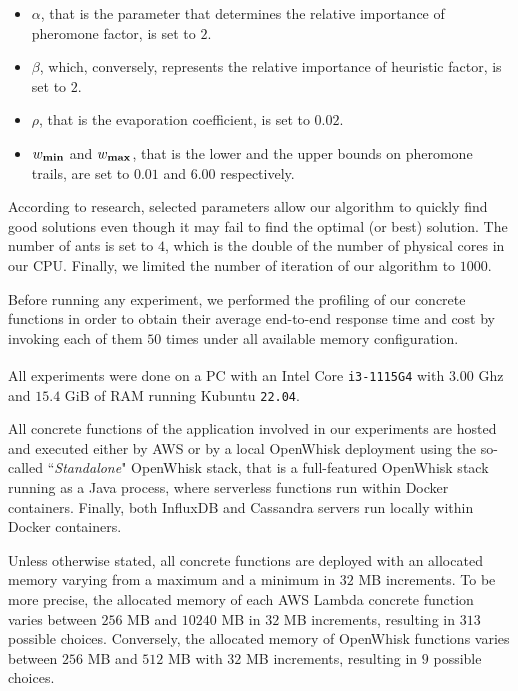 \documentclass[12pt,a4paper]{report}
\newcommand{\ItalicQuotMark}[1]{``\textit{#1}"}
\begin{document}
\begin{itemize}
	\item $\alpha$, that is the parameter that determines the relative importance of pheromone factor, is set to $2$.
	\item $\beta$, which, conversely, represents the relative importance of heuristic factor, is set to $2$.
	\item $\rho$, that is the evaporation coefficient, is set to $0.02$.
	\item $w_{\text{\textbf{min}}}$ and $w_{\text{\textbf{max}}}$, that is the lower and the upper bounds on pheromone trails, are set to $0.01$ and $6.00$ respectively.
\end{itemize}

According to \citet{acosemplice} research, selected parameters allow our algorithm to quickly find good solutions even though it may fail to find the optimal (or best) solution. The number of ants is set to $4$, which is the double of the number of physical cores in our CPU. Finally, we limited the number of iteration of our algorithm to $1000$.

Before running any experiment, we performed the profiling of our concrete functions in order to obtain their average end-to-end response time and cost by invoking each of them $50$ times under all available memory configuration.

All experiments were done on a PC with an Intel\textsuperscript{\textregistered} Core\textsuperscript{\texttrademark} \texttt{i3-1115G4} with $3.00$ Ghz and $15.4$ GiB of RAM running Kubuntu \texttt{22.04}.

All concrete functions of the application involved in our experiments are hosted and executed either by AWS or by a local OpenWhisk deployment using the so-called \ItalicQuotMark{Standalone} OpenWhisk stack, that is a full-featured OpenWhisk stack running as a Java process, where serverless functions run within Docker containers. Finally, both InfluxDB and Cassandra servers run locally within Docker containers.

Unless otherwise stated, all concrete functions are deployed with an allocated memory varying from a maximum and a minimum in $32$ MB increments. To be more precise, the allocated memory of each AWS Lambda concrete function varies between $256$ MB and $10240$ MB in $32$ MB increments, resulting in $313$ possible choices. Conversely, the allocated memory of OpenWhisk functions varies between $256$ MB and $512$ MB with $32$ MB increments, resulting in $9$ possible choices. 
\end{document}
